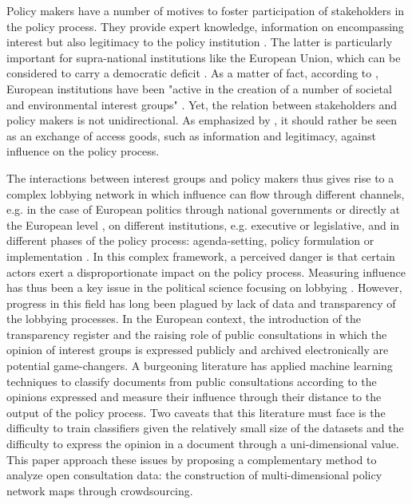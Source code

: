 \documentclass[ 11pt]{article}
\begin{document}
Policy makers have a number of motives to foster participation of stakeholders in the policy process. They provide expert knowledge, information on encompassing interest but also legitimacy to the policy institution \parencite[see in particular][]{bouwen2002corporate,kohler2007institutional,de2016pressure}. The latter is particularly important for supra-national institutions like the European Union, which can be considered to carry a democratic deficit \parencite{follesdal2006there}. As a matter of fact, according to \parencite{coen2009lobbying}, European institutions have been "active in the creation of  a number of societal and environmental interest groups" \parencite[see also][]{kohler2007institutional, kluver2013lobbying}. Yet, the relation between stakeholders and policy makers is not unidirectional. As emphasized by \parencite{bouwen2002corporate}, it should rather be seen as an exchange of access goods, such as information and legitimacy, against influence on the policy process.

The interactions between interest groups and policy makers thus gives rise to a complex lobbying network \parencite{coen2009lobbying} in which influence can flow through different channels, e.g. in the case of European politics through national governments or directly at the European level \parencite{pappi1999organization}, on different institutions, e.g. executive or legislative, and in different phases of the policy process: agenda-setting, policy formulation or implementation  \parencite[see e.g.][]{dur2007inclusion}. In this complex framework, a perceived danger is that certain actors exert a disproportionate impact on the policy process. Measuring influence has thus been a key issue in the political science focusing on lobbying \parencite[see e.g.][]{mahoney2007lobbying,dur2008measuring}. However,  progress in this field has long been plagued by lack of data and transparency of the lobbying processes. In the European context, the introduction of the transparency register \parencite{greenwood2013transparency} and the raising role of public consultations \parencite{schmidt2013democracy} in which the opinion of  interest groups is expressed publicly and archived electronically are potential game-changers. A burgeoning literature \parencite[e.g.][]{kluver2009measuring,kluver2011contextual,kluver2013lobbying,kluver2015promises,beyers2014policy} has applied machine learning techniques to classify documents from public consultations according to the opinions expressed and measure their influence through their distance to the output of the policy process. Two caveats that this literature must face is the difficulty to train classifiers given the relatively small size of the datasets \parencite[see e.g.][]{bunea2015quantitative} and the difficulty to express the opinion in a document through a uni-dimensional value. This paper approach these issues by proposing a complementary method to analyze open consultation data: the construction of multi-dimensional policy network maps through crowdsourcing. 
\printbibliography
%
%
\end{document}
